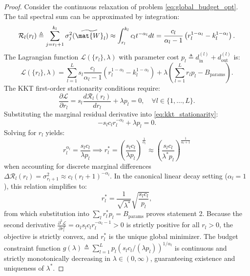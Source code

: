 \begin{proof}
Consider the continuous relaxation of problem \eqref{eq:global_budget_opt}. The tail spectral sum can be approximated by integration:
\begin{equation}
\mathcal{R}_l(r_l) \triangleq \sum_{j=r_l+1}^{k_l} \sigma_j^2(\widetilde{\mat{W}}_l) \approx \int_{r_l}^{k_l} c_l t^{-\alpha_l} dt = \frac{c_l}{\alpha_l - 1} \left( r_l^{1 - \alpha_l} - k_l^{1 - \alpha_l} \right).
\end{equation}
The Lagrangian function $\mathcal{L}(\{r_l\}, \lambda)$ with parameter cost $p_l \triangleq d_{\text{in}}^{(l)} + d_{\text{out}}^{(l)}$ is:
\begin{equation}
\mathcal{L}(\{r_l\}, \lambda) = \sum_{l=1}^L s_l \frac{c_l}{\alpha_l - 1} \left( r_l^{1 - \alpha_l} - k_l^{1 - \alpha_l} \right) + \lambda \left( \sum_{l=1}^L r_l p_l - B_{\text{params}} \right).
\end{equation}
The KKT first-order stationarity conditions require:
\begin{equation}
\frac{\partial \mathcal{L}}{\partial r_l} = s_l \frac{d \mathcal{R}_l(r_l)}{d r_l} + \lambda p_l = 0, \quad \forall l \in \{1, \dots, L\}.
\label{eq:kkt_stationarity}
\end{equation}
Substituting the marginal residual derivative into \eqref{eq:kkt_stationarity}:
\begin{equation}
-s_l c_l r_l^{-\alpha_l} + \lambda p_l = 0.
\label{eq:kkt_stationarity_explicit}
\end{equation}
Solving for $r_l$ yields:
\begin{equation}
r_l^{\alpha_l} = \frac{s_l c_l}{\lambda p_l} \implies r_l^* = \left( \frac{s_l c_l}{\lambda p_l} \right)^{\frac{1}{\alpha_l}} \approx \left( \frac{s_l c_l}{\lambda^* p_l} \right)^{\frac{1}{\alpha_l + 1}}
\end{equation}
when accounting for discrete marginal differences $\Delta \mathcal{R}_l(r_l) = \sigma_{r_l+1}^2 \approx c_l (r_l+1)^{-\alpha_l}$. In the canonical linear decay setting ($\alpha_l = 1$), this relation simplifies to:
\begin{equation}
r_l^* = \frac{1}{\sqrt{\lambda^*}} \sqrt{\frac{s_l c_l}{p_l}},
\label{eq:alpha1_rank_relation}
\end{equation}
from which substitution into $\sum_l r_l^* p_l = B_{\text{params}}$ proves statement 2. Because the second derivative $\frac{\partial^2 \mathcal{L}}{\partial r_l^2} = \alpha_l s_l c_l r_l^{-\alpha_l - 1} > 0$ is strictly positive for all $r_l > 0$, the objective is strictly convex, and $r_l^*$ is the unique global minimizer. The budget constraint function $g(\lambda) \triangleq \sum_{l=1}^L p_l (s_l c_l / (\lambda p_l))^{1/\alpha_l}$ is continuous and strictly monotonically decreasing in $\lambda \in (0, \infty)$, guaranteeing existence and uniqueness of $\lambda^*$.
\end{proof}

